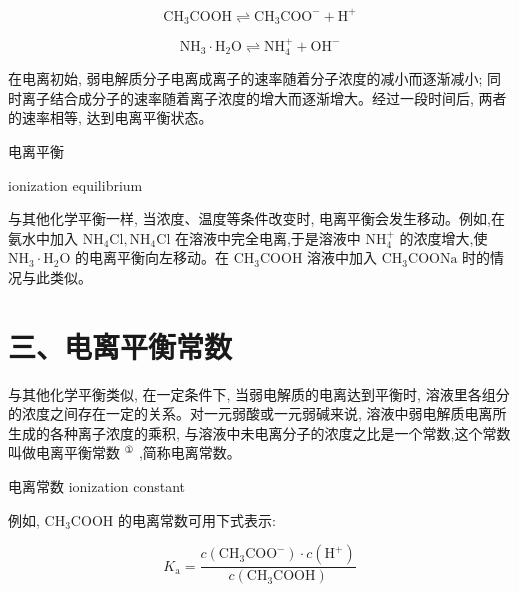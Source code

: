 \documentclass[10pt]{article}
\begin{document}
\[
{\mathrm{{CH}}}_{3}\mathrm{{COOH}} \rightleftharpoons {\mathrm{{CH}}}_{3}{\mathrm{{COO}}}^{ - } + {\mathrm{H}}^{ + }
\]

\[
{\mathrm{{NH}}}_{3} \cdot {\mathrm{H}}_{2}\mathrm{O} \rightleftharpoons {\mathrm{{NH}}}_{4}^{ + } + {\mathrm{{OH}}}^{ - }
\]

在电离初始, 弱电解质分子电离成离子的速率随着分子浓度的减小而逐渐减小; 同时离子结合成分子的速率随着离子浓度的增大而逐渐增大。经过一段时间后, 两者的速率相等, 达到电离平衡状态。

\begin{mdframed}

电离平衡

ionization equilibrium

\end{mdframed}

与其他化学平衡一样, 当浓度、温度等条件改变时, 电离平衡会发生移动。例如,在氨水中加入 \({\mathrm{{NH}}}_{4}\mathrm{{Cl}},{\mathrm{{NH}}}_{4}\mathrm{{Cl}}\) 在溶液中完全电离,于是溶液中 \({\mathrm{{NH}}}_{4}^{ + }\) 的浓度增大,使 \({\mathrm{{NH}}}_{3} \cdot {\mathrm{H}}_{2}\mathrm{O}\) 的电离平衡向左移动。在 \({\mathrm{{CH}}}_{3}\mathrm{{COOH}}\) 溶液中加入 \({\mathrm{{CH}}}_{3}\mathrm{{COONa}}\) 时的情况与此类似。

\section*{三、电离平衡常数}

与其他化学平衡类似, 在一定条件下, 当弱电解质的电离达到平衡时, 溶液里各组分的浓度之间存在一定的关系。对一元弱酸或一元弱碱来说, 溶液中弱电解质电离所生成的各种离子浓度的乘积, 与溶液中未电离分子的浓度之比是一个常数,这个常数叫做电离平衡常数 \({}^{\text{①}}\) ,简称电离常数。

\begin{mdframed}

电离常数 ionization constant

\end{mdframed}


例如, \({\mathrm{{CH}}}_{3}\mathrm{{COOH}}\) 的电离常数可用下式表示:

\[
{K}_{\mathrm{a}} = \frac{c\left( {{\mathrm{{CH}}}_{3}{\mathrm{{COO}}}^{ - }}\right) \cdot c\left( {\mathrm{H}}^{ + }\right) }{c\left( {{\mathrm{{CH}}}_{3}\mathrm{{COOH}}}\right) }
\]
\end{document}
